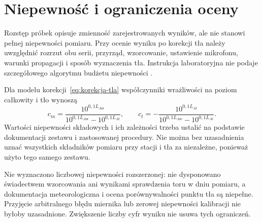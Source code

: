 \section{Niepewność i ograniczenia oceny}
\label{sec:niepewnosc}
Rozstęp próbek opisuje zmienność zarejestrowanych wyników,
ale nie stanowi pełnej niepewności pomiaru. Przy ocenie wyniku
po korekcji tła należy uwzględnić rozrzut obu serii, przyrząd,
wzorcowanie, ustawienie mikrofonu, warunki propagacji i sposób
wyznaczenia tła. Instrukcja laboratoryjna nie podaje szczegółowego
algorytmu budżetu niepewności \autocite{piechowicz-konspekt}.

Dla modelu korekcji~\eqref{eq:korekcja-tla} współczynniki
wrażliwości na poziom całkowity i tło wynoszą
\begin{equation}
 c_m=\frac{10^{0{,}1L_{A\mathrm{sr}}}}
 {10^{0{,}1L_{A\mathrm{sr}}}-10^{0{,}1L_{At}}},\qquad
 c_t=-\frac{10^{0{,}1L_{At}}}
 {10^{0{,}1L_{A\mathrm{sr}}}-10^{0{,}1L_{At}}}.
\end{equation}
Wartości niepewności składowych i ich zależności trzeba ustalić
na podstawie dokumentacji zestawu i zastosowanej procedury.
Nie można bez uzasadnienia uznać wszystkich składników pomiaru
przy stacji i tła za niezależne, ponieważ użyto tego samego zestawu.

Nie wyznaczono liczbowej niepewności rozszerzonej: nie dysponowano
świadectwem wzorcowania ani wynikami sprawdzenia toru w dniu
pomiaru, a dokumentacja meteorologiczna i ocena porównywalności
punktu tła są niepełne. Przyjęcie arbitralnego błędu miernika lub
zerowej niepewności kalibracji nie byłoby uzasadnione.
Zwiększenie liczby cyfr wyniku nie usuwa tych ograniczeń.
